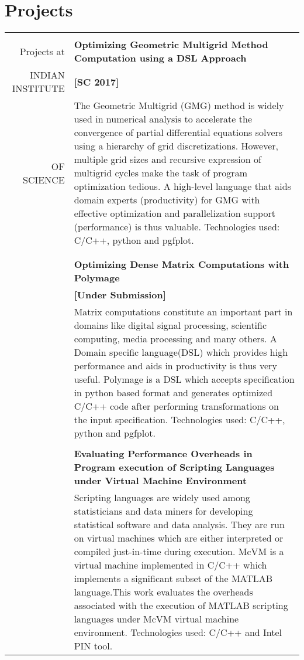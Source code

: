 \documentclass[a4paper,10pt]{article} %
\begin{document}
\section{Projects}
\begin{tabular}{rp{13cm}}
&\\
Projects at & \textbf{Optimizing Geometric Multigrid Method Computation using a DSL Approach} \\
INDIAN INSTITUTE & \hspace{25em} \textbf{[SC 2017]} \\
OF SCIENCE 
& \setlength{\leftskip}{0.4cm}
The Geometric Multigrid (GMG) method is widely used in numerical analysis to accelerate the convergence of partial differential equations solvers using
a hierarchy of grid discretizations. However, multiple grid sizes and recursive 
expression of multigrid cycles make the task of program optimization tedious.
A high-level language that aids domain experts (productivity) for GMG with
effective optimization and parallelization support (performance) is thus
valuable. Technologies used: C/C++, python and pgfplot.\\
& \\
& \\
& \textbf{Optimizing Dense Matrix Computations with Polymage } \\
& \hspace{25em} \textbf{[Under Submission]}\\
& \setlength{\leftskip}{0.4cm}
Matrix computations constitute an important part in domains like digital signal
processing, scientific computing, media processing and many others. A Domain
specific language(DSL) which provides high performance and aids in productivity is
thus very useful. Polymage is a DSL which accepts specification in python based
format and generates optimized C/C++ code after performing transformations on
the input specification. Technologies used: C/C++, python and pgfplot.\\
&\\
& \textbf{Evaluating Performance Overheads in Program execution of Scripting Languages under Virtual Machine Environment} \\
& \setlength{\leftskip}{0.4cm}
Scripting languages are widely used among statisticians and data miners for
developing statistical software and data analysis. They are run on virtual
machines which are either interpreted or compiled just-in-time during
execution. McVM is a
virtual machine implemented in C/C++ which implements a significant subset of
the MATLAB language.This work evaluates the overheads associated with the execution of
MATLAB scripting languages under McVM virtual machine environment. Technologies used: C/C++ and Intel PIN tool.\\

\end{tabular}
\end{document}

